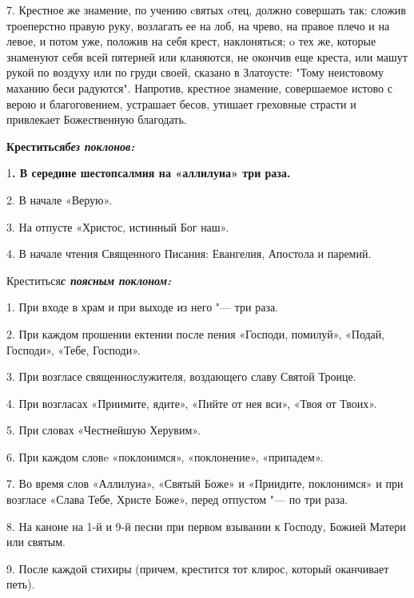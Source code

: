 7. Крестное же знамение, по учению cвятых oтец, должно совершать так: сложив троеперстно правую руку, возлагать ее на лоб, на чрево, на правое плечо и на левое, и потом уже, положив на себя крест, наклоняться;  o тех же, которые знаменуют себя всей пятерней или кланяются, не окончив еще креста, или машут рукой по воздуху или по груди своей, сказано в Златоусте: "Тому неистовому маханию беси радуются". Напротив, крестное знамение, совершаемое истово с верою и благоговением, устрашает бесов, утишает греховные страсти и привлекает Божественную благодать. 




\mychapterending

 


\bfseries Креститься\normalfont{}\bfseries \itshape  без поклоно\normalfont{}\normalfont{}\bfseries в: \normalfont{}

1\bfseries .\normalfont{} В середине шестопсалмия на «аллилуиа» три раза. 

2. В начале «Верую». 

3. На отпусте «Христос, истинный Бог наш». 

4. В начале чтения Священного Писания: Евангелия, Апостола и паремий. 

\bfseries 

Креститься\normalfont{}\bfseries \itshape  с поясным поклоно\normalfont{}\normalfont{}\bfseries м: 

1.\normalfont{} При входе в храм и при выходе из него "--- три раза. 

2. При каждом прошении ектении после пения «Господи, помилуй», «Подай, Господи», «Тебе, Господи». 

3. При возгласе священнослужителя, воздающего славу Святой Троице. 

4. При возгласах «Приимите, ядите», «Пийте от нея вси», «Твоя от Твоих». 

5. При словах «Честнейшую Херувим». 

6. При каждом словe «поклонимся», «поклонение», «припадем». 

7. Во время слов «Аллилуиа», «Святый Боже» и «Приидите, поклонимся» и при возгласе «Слава Тебе, Христе Боже», перед отпустом "--- по три раза. 

8. На каноне на 1-й и 9-й песни при первом взывании к Господу, Божией Матери или святым.

9. После каждой стихиры (причем, крестится тот клирос, который оканчивает петь).

